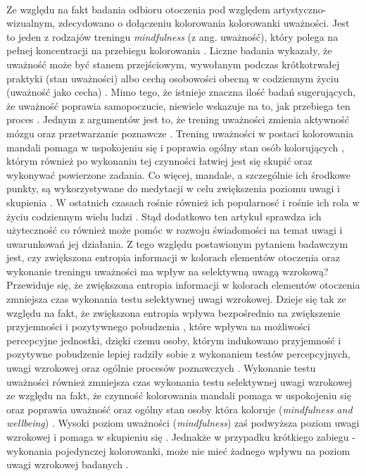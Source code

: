 \documentclass[12pt,a4paper,final,oneside,onecolumn,titlepage]{article}
\begin{document}
\paragraph{}
Ze względu na fakt badania odbioru otoczenia pod względem artystyczno-wizualnym, zdecydowano o dołączeniu kolorowania kolorowanki uważności. Jest to jeden z rodzajów treningu \textit{mindfulness} (z ang. uważność), który polega na pełnej koncentracji na przebiegu kolorowania \citep{zejmo_praktyka_2022}. Liczne badania wykazały, że uważność może być stanem przejściowym, wywołanym podczas krótkotrwałej praktyki (stan uważności) albo cechą osobowości obecną w codziennym życiu (uważność jako cecha) \citep{kiken_state_2015}. Mimo tego, że istnieje znaczna ilość badań sugerujących, że uważność poprawia samopoczucie, niewiele wskazuje na to, jak przebiega ten proces \citep{holzel_how_2011}. Jednym z argumentów jest to, że trening uważności zmienia aktywność mózgu \citep{gotink_8-week_2016} oraz przetwarzanie poznawcze \citep{zeidan_mindfulness_2010}. Trening uważności w postaci kolorowania mandali pomaga w uspokojeniu się i poprawia ogólny stan osób kolorujących \citep{carsley_effectiveness_2018, campenni_effects_2020}, którym również po wykonaniu tej czynności łatwiej jest się skupić oraz wykonywać powierzone zadania. Co więcej, mandale, a szczególnie ich środkowe punkty, są wykorzystywane do medytacji w celu zwiększenia poziomu uwagi i skupienia \citep{shankar_effectiveness_2020}. W ostatnich czasach rośnie również ich popularnosć i rośnie ich rola w życiu codziennym wielu ludzi \citep{dresler_doing_2019}. Stąd dodatkowo ten artykuł sprawdza ich użyteczność co również może pomóc w rozwoju świadomości na temat uwagi i uwarunkowań jej działania. Z tego względu postawionym pytaniem badawczym jest, czy zwiększona entropia informacji w kolorach elementów otoczenia oraz wykonanie treningu uważności ma wpływ na selektywną uwagą wzrokową? Przewiduje się, że zwiększona entropia informacji w kolorach elementów otoczenia zmniejsza czas wykonania testu selektywnej uwagi wzrokowej. Dzieje się tak ze względu na fakt, że zwiększona entropia wpływa bezpośrednio na zwiększenie przyjemności i pozytywnego pobudzenia \citep{stamps_entropy_2004, stamps_entropy_2002}, które wpływa na możliwości percepcyjne jednostki, dzięki czemu osoby, którym indukowano przyjemność i pozytywne pobudzenie lepiej radziły sobie z wykonaniem testów percepcyjnych, uwagi wzrokowej oraz ogólnie procesów poznawczych \citep{mcconnell_upbeat_2011, gavazzi_pleasure_2021}. Wykonanie testu uważności również zmniejsza czas wykonania testu selektywnej uwagi wzrokowej ze względu na fakt, że czynność kolorowania mandali pomaga w uspokojeniu się oraz poprawia uważność oraz ogólny stan osoby która koloruje (\textit{mindfulness and wellbeing}) \citep{carsley_effectiveness_2018, campenni_effects_2020}. Wysoki poziom uważności (\textit{mindfulness}) zaś podwyższa poziom uwagi wzrokowej i pomaga w skupieniu się \citep{campillo_effects_2018, sumantry_meditation_2021}. Jednakże w przypadku krótkiego zabiegu - wykonania pojedynczej kolorowanki, może nie mieć żadnego wpływu na poziom uwagi wzrokowej badanych \citep{thompson_influence_2021}.
\end{document}
